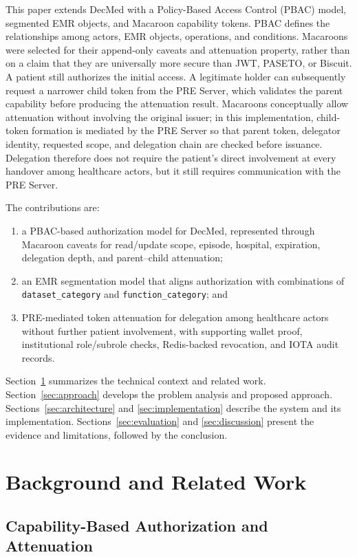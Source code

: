 \documentclass[conference,a4paper,english]{IEEEtran}
\begin{document}
This paper extends DecMed with a Policy-Based Access Control (PBAC) model, segmented EMR objects, and Macaroon capability tokens. PBAC defines the relationships among actors, EMR objects, operations, and conditions. Macaroons were selected for their append-only caveats and attenuation property, rather than on a claim that they are universally more secure than JWT, PASETO, or Biscuit. A patient still authorizes the initial access. A legitimate holder can subsequently request a narrower child token from the PRE Server, which validates the parent capability before producing the attenuation result. Macaroons conceptually allow attenuation without involving the original issuer; in this implementation, child-token formation is mediated by the PRE Server so that parent token, delegator identity, requested scope, and delegation chain are checked before issuance. Delegation therefore does not require the patient's direct involvement at every handover among healthcare actors, but it still requires communication with the PRE Server.

The contributions are:
\begin{enumerate}
	\item a PBAC-based authorization model for DecMed, represented through Macaroon caveats for read/update scope, episode, hospital, expiration, delegation depth, and parent--child attenuation;
	\item an EMR segmentation model that aligns authorization with combinations of \texttt{dataset\_category} and \texttt{function\_category}; and
	\item PRE-mediated token attenuation for delegation among healthcare actors without further patient involvement, with supporting wallet proof, institutional role/subrole checks, Redis-backed revocation, and IOTA audit records.
\end{enumerate}

Section~\ref{sec:background} summarizes the technical context and related work. Section~\ref{sec:approach} develops the problem analysis and proposed approach. Sections~\ref{sec:architecture} and \ref{sec:implementation} describe the system and its implementation. Sections~\ref{sec:evaluation} and \ref{sec:discussion} present the evidence and limitations, followed by the conclusion.
 \section{Background and Related Work}
\label{sec:background}

\subsection{Capability-Based Authorization and Attenuation}
\end{document}
